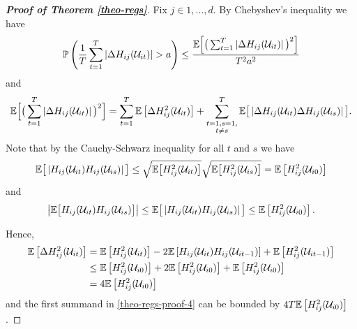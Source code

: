 \documentclass[a4paper,12pt]{article}
\begin{document}
\begin{proof}[\textnormal{\textbf{Proof of Theorem \ref{theo-regs}}}]
Fix $j \in {1, \ldots, d}$. By Chebyshev's inequality we have
\begin{align}\label{theo-regs-proof-3}
\mathbb{P} \left(\frac{1}{T} \sum_{t=1}^T \left|\Delta  H_{ij} (\mathcal{U}_{it})\right| > a \right) \leq \frac{\mathbb{E} \Big[ \big(\sum_{t=1}^T \left|\Delta  H_{ij} (\mathcal{U}_{it})\right|\big)^2 \Big]}{T^2 a^2}
\end{align}
and 
\begin{align}\label{theo-regs-proof-4}
\begin{split}
\mathbb{E} \Big[ \big( \sum_{t=1}^T \left|\Delta  H_{ij} (\mathcal{U}_{it})\right|\big)^2 \Big] =  \sum_{t=1}^T \mathbb{E} \left[ \Delta  H^2_{ij} (\mathcal{U}_{it})  \right] + \sum_{\substack{t=1, s = 1,\\ t\neq s}}^T\mathbb{E} \big[ \left|\Delta  H_{ij} (\mathcal{U}_{it}) \Delta  H_{ij} (\mathcal{U}_{is})\right| \big].
\end{split}
\end{align}
Note that by the Cauchy-Schwarz inequality for all $t$ and $s$ we have
\begin{align*}
 \mathbb{E} \big[ \left| H_{ij}(\mathcal{U}_{it}) H_{ij}(\mathcal{U}_{is})\right| \big] \leq \sqrt{\mathbb{E}\big[ H^2_{ij}(\mathcal{U}_{it})\big]} \sqrt{ \mathbb{E} \big[H^2_{ij}(\mathcal{U}_{is})\big]} = \mathbb{E} \left[ H^2_{ij}(\mathcal{U}_{i0}) \right] 
\end{align*}
and 
\begin{align}\label{theo-regs-proof-5}
 \left|\mathbb{E} \big[ H_{ij}(\mathcal{U}_{it}) H_{ij}(\mathcal{U}_{is}) \big]\right|\leq \mathbb{E} \big[ \left| H_{ij}(\mathcal{U}_{it}) H_{ij}(\mathcal{U}_{is})\right| \big] \leq  \mathbb{E} \left[ H^2_{ij}(\mathcal{U}_{i0}) \right].
\end{align}

Hence, 
\begin{align*}
 \mathbb{E} \left[ \Delta  H^2_{ij} (\mathcal{U}_{it})  \right]  &=  \mathbb{E} \left[ H^2_{ij} (\mathcal{U}_{it}) \right] - 2\mathbb{E} \left[ H_{ij} (\mathcal{U}_{it}) H_{ij}(\mathcal{U}_{it-1}) \right]  + \mathbb{E} \left[ H^2_{ij}(\mathcal{U}_{it-1}) \right] \\
& \leq \mathbb{E} \left[ H^2_{ij} (\mathcal{U}_{i0}) \right] + 2\mathbb{E} \left[ H^2_{ij} (\mathcal{U}_{i0}) \right]  + \mathbb{E} \left[ H^2_{ij}(\mathcal{U}_{i0}) \right] \\
&= 4 \mathbb{E} \left[ H^2_{ij} (\mathcal{U}_{i0}) \right]
\end{align*}
and the first summand in \eqref{theo-regs-proof-4} can be bounded by $4T\mathbb{E} \left[ H^2_{ij} (\mathcal{U}_{i0}) \right]$.


\end{proof}
\end{document}
